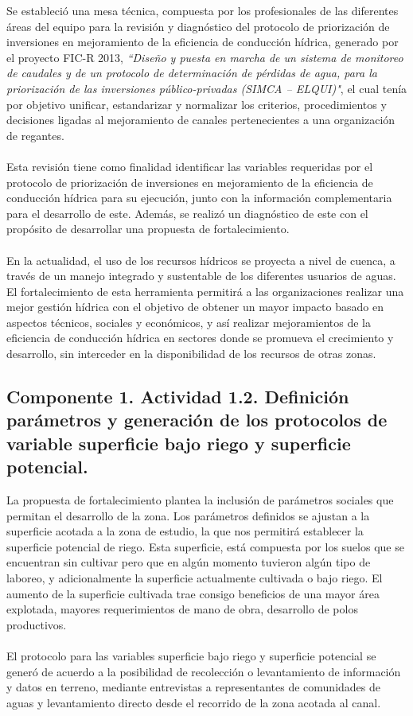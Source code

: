\documentclass[]{article}
\begin{document}
Se estableció una mesa técnica, compuesta por los profesionales de las diferentes áreas del equipo para la revisión y diagnóstico del protocolo de priorización de inversiones en mejoramiento de la eficiencia de conducción hídrica, generado por el proyecto FIC-R 2013, \textit{``Diseño y puesta en marcha de un sistema de monitoreo de caudales y de un protocolo de determinación de pérdidas de agua, para la priorización de las inversiones público-privadas (SIMCA – ELQUI)"}, el cual tenía por objetivo unificar, estandarizar y normalizar los criterios, procedimientos y decisiones ligadas al mejoramiento de canales pertenecientes a una organización de regantes.\\
\\
Esta revisión tiene como finalidad identificar las variables requeridas por el protocolo de priorización de inversiones en mejoramiento de la eficiencia de conducción hídrica para su ejecución, junto con la información complementaria para el desarrollo de este. Además, se realizó un diagnóstico de este con el propósito de desarrollar una propuesta de fortalecimiento.\\
\\
En la actualidad, el uso de los recursos hídricos se proyecta a nivel de cuenca, a través de un manejo integrado y sustentable de los diferentes usuarios de aguas. El fortalecimiento de esta herramienta permitirá a las organizaciones realizar una mejor gestión hídrica con el objetivo de obtener un mayor impacto basado en aspectos técnicos, sociales y económicos, y así realizar mejoramientos de la eficiencia de conducción hídrica en sectores donde se promueva el crecimiento y desarrollo, sin interceder en la disponibilidad de los recursos de otras zonas.

\subsection{Componente 1. Actividad 1.2. Definición parámetros y generación de los protocolos de variable superficie bajo riego y superficie potencial.}

La propuesta de fortalecimiento plantea la inclusión de parámetros sociales que permitan el desarrollo de la zona. Los parámetros definidos se ajustan a la superficie acotada a la zona de estudio, la que nos permitirá establecer la superficie potencial de riego. Esta superficie, está compuesta por los suelos que se encuentran sin cultivar pero que en algún momento tuvieron algún tipo de laboreo, y adicionalmente la superficie actualmente cultivada o bajo riego. El aumento de la superficie cultivada trae consigo beneficios de una mayor área explotada, mayores requerimientos de mano de obra, desarrollo de polos productivos.\\
\\
El protocolo para las variables superficie bajo riego y superficie potencial se generó de acuerdo a la posibilidad de recolección o levantamiento de información y datos en terreno, mediante entrevistas a representantes de comunidades de aguas y levantamiento directo desde el recorrido de la zona acotada al canal.
\end{document}
